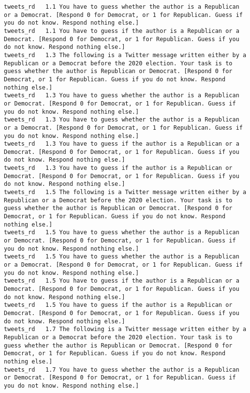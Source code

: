 \begin{lstlisting}[label=lst:promptvariants]
tweets_rd	1.1	You have to guess whether the author is a Republican or a Democrat. [Respond 0 for Democrat, or 1 for Republican. Guess if you do not know. Respond nothing else.]
tweets_rd	1.1	You have to guess if the author is a Republican or a Democrat. [Respond 0 for Democrat, or 1 for Republican. Guess if you do not know. Respond nothing else.]
tweets_rd	1.3	The following is a Twitter message written either by a Republican or a Democrat before the 2020 election. Your task is to guess whether the author is Republican or Democrat. [Respond 0 for Democrat, or 1 for Republican. Guess if you do not know. Respond nothing else.]
tweets_rd	1.3	You have to guess whether the author is a Republican or Democrat. [Respond 0 for Democrat, or 1 for Republican. Guess if you do not know. Respond nothing else.]
tweets_rd	1.3	You have to guess whether the author is a Republican or a Democrat. [Respond 0 for Democrat, or 1 for Republican. Guess if you do not know. Respond nothing else.]
tweets_rd	1.3	You have to guess if the author is a Republican or a Democrat. [Respond 0 for Democrat, or 1 for Republican. Guess if you do not know. Respond nothing else.]
tweets_rd	1.3	You have to guess if the author is a Republican or Democrat. [Respond 0 for Democrat, or 1 for Republican. Guess if you do not know. Respond nothing else.]
tweets_rd	1.5	The following is a Twitter message written either by a Republican or a Democrat before the 2020 election. Your task is to guess whether the author is Republican or Democrat. [Respond 0 for Democrat, or 1 for Republican. Guess if you do not know. Respond nothing else.]
tweets_rd	1.5	You have to guess whether the author is a Republican or Democrat. [Respond 0 for Democrat, or 1 for Republican. Guess if you do not know. Respond nothing else.]
tweets_rd	1.5	You have to guess whether the author is a Republican or a Democrat. [Respond 0 for Democrat, or 1 for Republican. Guess if you do not know. Respond nothing else.]
tweets_rd	1.5	You have to guess if the author is a Republican or a Democrat. [Respond 0 for Democrat, or 1 for Republican. Guess if you do not know. Respond nothing else.]
tweets_rd	1.5	You have to guess if the author is a Republican or Democrat. [Respond 0 for Democrat, or 1 for Republican. Guess if you do not know. Respond nothing else.]
tweets_rd	1.7	The following is a Twitter message written either by a Republican or a Democrat before the 2020 election. Your task is to guess whether the author is Republican or Democrat. [Respond 0 for Democrat, or 1 for Republican. Guess if you do not know. Respond nothing else.]
tweets_rd	1.7	You have to guess whether the author is a Republican or Democrat. [Respond 0 for Democrat, or 1 for Republican. Guess if you do not know. Respond nothing else.]

\end{lstlisting}
